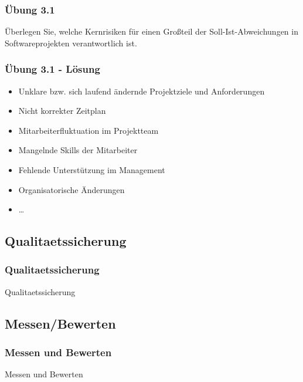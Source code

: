 \begin{frame}
\frametitle{Übung 3.1}
	Überlegen Sie, welche Kernrisiken für einen Großteil der Soll-Ist-Abweichungen
	in Softwareprojekten verantwortlich ist.
\end{frame}

\ifloesung
\begin{frame}
\frametitle{Übung 3.1 - Lösung}
	\begin{itemize}
		\item Unklare bzw. sich laufend ändernde Projektziele und Anforderungen
		\item Nicht korrekter Zeitplan
		\item Mitarbeiterfluktuation im Projektteam
		\item Mangelnde Skills der Mitarbeiter
		\item Fehlende Unterstützung im Management
		\item Organisatorische Änderungen
		\item \ldots
	\end{itemize}
\end{frame}

\subsection{Qualitaetssicherung}
\begin{frame}
\frametitle{Qualitaetssicherung}
\huge Qualitaetssicherung
\end{frame}

\subsection{Messen/Bewerten}
\begin{frame}
\frametitle{Messen und Bewerten}
\huge Messen und Bewerten
\end{frame}
